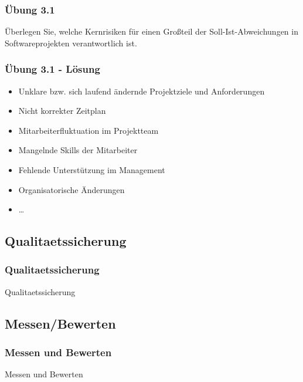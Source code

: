 \begin{frame}
\frametitle{Übung 3.1}
	Überlegen Sie, welche Kernrisiken für einen Großteil der Soll-Ist-Abweichungen
	in Softwareprojekten verantwortlich ist.
\end{frame}

\ifloesung
\begin{frame}
\frametitle{Übung 3.1 - Lösung}
	\begin{itemize}
		\item Unklare bzw. sich laufend ändernde Projektziele und Anforderungen
		\item Nicht korrekter Zeitplan
		\item Mitarbeiterfluktuation im Projektteam
		\item Mangelnde Skills der Mitarbeiter
		\item Fehlende Unterstützung im Management
		\item Organisatorische Änderungen
		\item \ldots
	\end{itemize}
\end{frame}

\subsection{Qualitaetssicherung}
\begin{frame}
\frametitle{Qualitaetssicherung}
\huge Qualitaetssicherung
\end{frame}

\subsection{Messen/Bewerten}
\begin{frame}
\frametitle{Messen und Bewerten}
\huge Messen und Bewerten
\end{frame}
